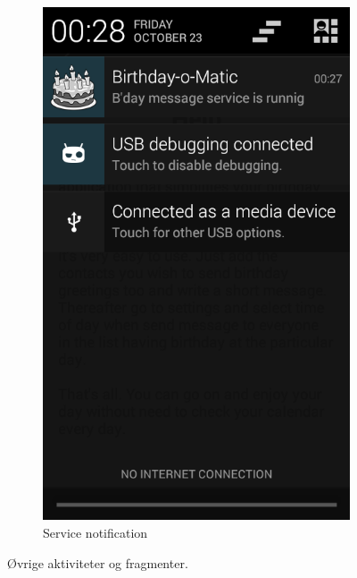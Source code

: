\begin{figure}[ht]
\begin{subfigure}[b]{0.35\textwidth}
        \includegraphics[width=\textwidth]{./img/10.png}
        \caption{Service notification}
        \label{fig:notification}
    \end{subfigure}
    \caption{Øvrige aktiviteter og fragmenter.}
    \label{fig:ovrige_aktiviteter}
\end{figure}

